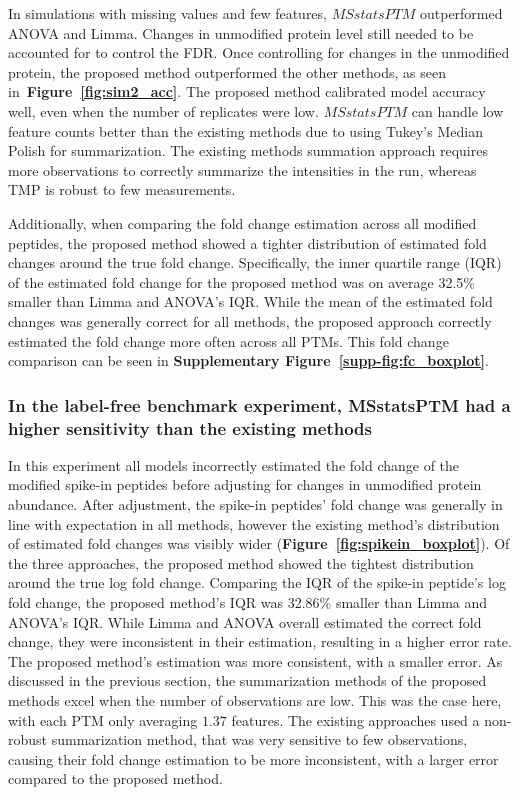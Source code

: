 \documentclass[mcp]{article}
\numberwithin{table}{section}
\def\figref#1{{\bf Figure~\ref{fig:#1}}}
\begin{document}
In simulations with missing values and few features, $MSstatsPTM$ outperformed ANOVA and Limma. Changes in unmodified protein level still needed to be accounted for to control the FDR. Once controlling for changes in the unmodified protein, the proposed method outperformed the other methods, as seen in~\figref{sim2_acc}. The proposed method calibrated model accuracy  well, even when the number of replicates were low. $MSstatsPTM$ can handle low feature counts better than the existing methods due to using Tukey's Median Polish for summarization. The existing methods summation approach requires more observations to correctly summarize the intensities in the run, whereas TMP is robust to few measurements.

Additionally, when comparing the fold change estimation across all modified peptides, the proposed method showed a tighter distribution of estimated fold changes around the true fold change. Specifically, the inner quartile range (IQR) of the estimated fold change for the proposed method was on average 32.5\% smaller than Limma and ANOVA's IQR. While the mean of the estimated fold changes was generally correct for all methods, the proposed approach correctly estimated the fold change more often across all PTMs. This fold change comparison can be seen in {\bf Supplementary Figure~\ref{supp-fig:fc_boxplot}}.

\subsubsection*{In the label-free benchmark experiment, MSstatsPTM had a higher sensitivity than the existing methods}

In this experiment all models incorrectly estimated the fold change of the modified spike-in peptides before adjusting for changes in unmodified protein abundance. After adjustment, the spike-in peptides' fold change was generally in line with expectation in all methods, however the existing method's distribution of estimated fold changes was visibly wider (\figref{spikein_boxplot}). Of the three approaches, the proposed method showed the tightest distribution around the true log fold change. Comparing the IQR of the spike-in peptide's log fold change, the proposed method's IQR was 32.86\% smaller than Limma and ANOVA's IQR. While Limma and ANOVA overall estimated the correct fold change, they were inconsistent in their estimation, resulting in a higher error rate. The proposed method's estimation was more consistent, with a smaller error. As discussed in the previous section, the summarization methods of the proposed methods excel when the number of observations are low. This was the case here, with each PTM only averaging $1.37$ features. The existing approaches used a non-robust summarization method, that was very sensitive to few observations, causing their fold change estimation to be more inconsistent, with a larger error compared to the proposed method.
\end{document}
